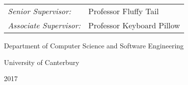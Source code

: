 \begin{titlepage}
\begin{center}
\begin{tabular}{ll}
		\emph{Senior Supervisor:} & Professor Fluffy Tail \\ 
		\emph{Associate Supervisor:} & Professor Keyboard Pillow \\ 
	\end{tabular}
	
	\vspace{1.1cm}

	\large{
		Department of Computer Science and Software Engineering
		
		University of Canterbury
		
		2017
	}
\end{center}
\end{titlepage}


